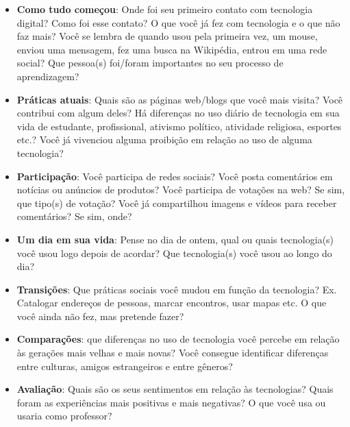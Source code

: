 \documentclass{textolivre}
\begin{document}
\begin{itemize}
\item \textbf{Como tudo começou}: Onde foi seu primeiro contato com tecnologia digital? Como foi esse contato? O que você já fez com tecnologia e o que não faz mais? Você se lembra de quando usou pela primeira vez, um mouse, enviou uma mensagem, fez uma busca na Wikipédia, entrou em uma rede social? Que pessoa(s) foi/foram importantes no seu processo de aprendizagem?
\item \textbf{Práticas atuais}: Quais são as páginas web/blogs que você mais visita? Você contribui com algum deles? Há diferenças no uso diário de tecnologia em sua vida de estudante, profissional, ativismo político, atividade religiosa, esportes etc.? Você já vivenciou alguma proibição em relação ao uso de alguma tecnologia?
\item \textbf{Participação}: Você participa de redes sociais? Você posta comentários em notícias ou anúncios de produtos? Você participa de votações na web? Se sim, que tipo(s) de votação? Você já compartilhou imagens e vídeos para receber comentários? Se sim, onde?
\item \textbf{Um dia em sua vida}: Pense no dia de ontem, qual ou quais tecnologia(s) você usou logo depois de acordar? Que tecnologia(s) você usou ao longo do dia?
\item  \textbf{Transições}: Que práticas sociais você mudou em função da tecnologia? Ex. Catalogar endereços de pessoas, marcar encontros, usar mapas etc. O que você ainda não fez, mas pretende fazer?
\item \textbf{Comparações}: que diferenças no uso de tecnologia você percebe em relação às gerações mais velhas e mais novas? Você consegue identificar diferenças entre culturas, amigos estrangeiros e entre gêneros?
\item  \textbf{Avaliação}: Quais são os seus sentimentos em relação às tecnologias? Quais foram as experiências mais positivas e mais negativas? O que você usa ou usaria como professor?
\end{itemize}
\end{document}
